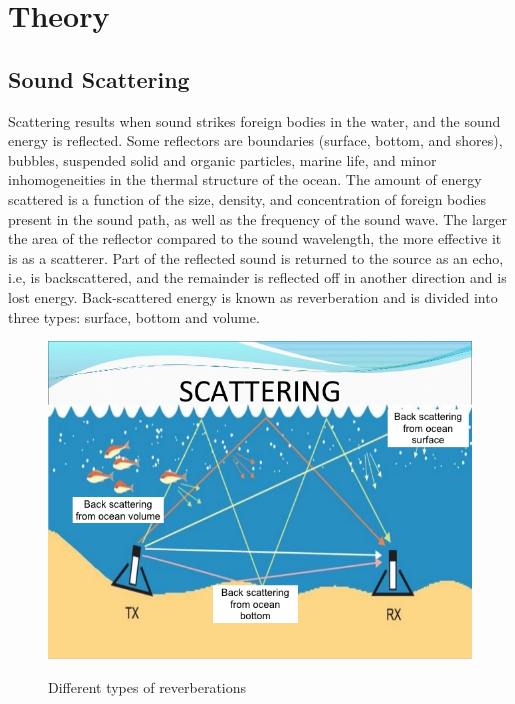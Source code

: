 \chapter{Theory} \label{Theory}

\section{ Sound Scattering } \label{ Sound Scattering }
\noindent Scattering results when sound strikes foreign bodies in the water, and the sound energy is reflected. Some reflectors are boundaries (surface, bottom, and shores), bubbles, suspended solid and organic particles, marine life, and minor inhomogeneities in the thermal structure of the ocean. The amount of energy scattered is a function of the size, density, and concentration of foreign bodies present in the sound path, as well as the frequency of the sound wave. The larger the area of the reflector compared to the sound wavelength, the more effective it is as a scatterer. Part of the reflected sound is returned to the source as an echo, i.e, is backscattered, and the remainder is reflected off in another direction and is lost energy. Back-scattered energy is known as reverberation and is divided into three types: surface, bottom and volume.

\begin{figure}[H]
\centering
{\includegraphics[scale=0.5]{scattering.png}}
\caption{ Different types of reverberations}
\end{figure}

